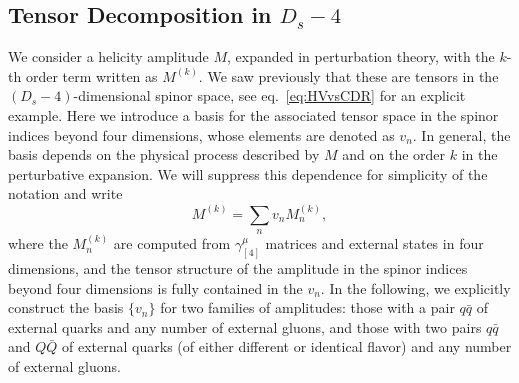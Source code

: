 \subsection{Tensor Decomposition in $D_s-4$}
\label{sec:HelAmplHV}

We consider a helicity amplitude $M$, expanded in 
perturbation theory, with the $k$-th order term written as
$M^{(k)}$.
We saw previously that these are tensors in the
$(D_s-4)$-dimensional spinor space, see
eq.~\eqref{eq:HVvsCDR} for an explicit example.
Here we introduce a basis for the associated tensor space in the
spinor indices beyond four dimensions, whose elements are 
denoted as $v_n$. In general,
the basis depends on the physical process described 
by $M$ and on the order $k$ in the perturbative
expansion. We will suppress this dependence for simplicity of 
the notation and write
\begin{equation}
  M^{(k)}= \sum_n  v_n M^{(k)}_n,
\label{eq:tensorDecomposition}
\end{equation}
where the $M^{(k)}_n$ are computed from
$\gamma_{[4]}^{\mu}$ matrices and external states in four dimensions, and the tensor structure
of the amplitude in the spinor indices beyond four dimensions is
fully contained in the $v_n$.
In the following, we explicitly construct the basis $\{v_n\}$
for two families of amplitudes: those with a pair $q\bar q$ of
external
quarks and any number of external gluons, and
those with two pairs $q\bar q$ and $Q\bar Q$
of external quarks (of either different or identical
flavor) and any number of external gluons.

